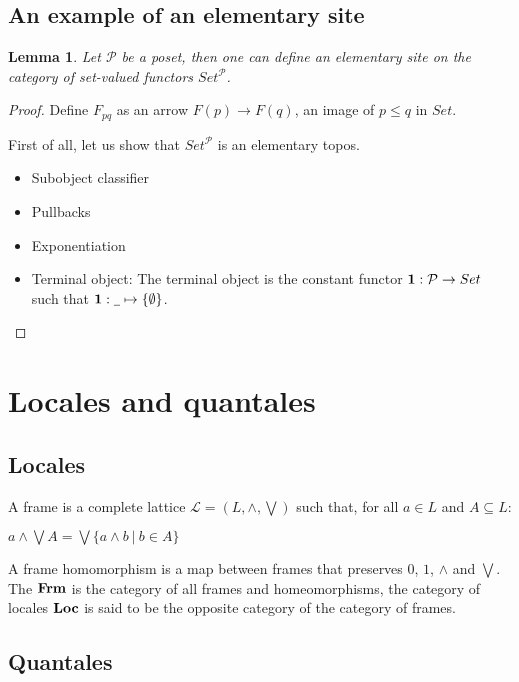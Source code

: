 \documentclass[a4paper]{article}
\theoremstyle{defin}
\theoremstyle{theorem}
\theoremstyle{claim}
\theoremstyle{prop}
\theoremstyle{lemma}
\newtheorem{lemma}{Lemma}
\theoremstyle{fact}
\theoremstyle{ex}
\theoremstyle{col}
\begin{document}
\subsection{An example of an elementary site}

\begin{lemma}
Let $\mathcal{P}$ be a poset, then one can define an elementary site on the category of set-valued functors $Set^{\mathcal{P}}$.
\end{lemma}

\begin{proof}
Define $F_{pq}$ as an arrow $F(p) \to F(q)$, an image of $p \leq q$ in $Set$.

First of all, let us show that $Set^{\mathcal{P}}$ is an elementary topos.
\begin{itemize}
\item Subobject classifier
\item Pullbacks
\item Exponentiation
\item Terminal object:
The terminal object is the constant functor ${\bf 1 } : \mathcal{P} \to Set$ such that ${\bf 1} : \underline{\:\:} \mapsto \{ \emptyset \}$.
\end{itemize}
\end{proof}


\section{Locales and quantales}

\subsection{Locales}

A frame is a complete lattice $\mathcal{L} = (L, \wedge, \bigvee)$ such that, for all $a \in L$ and $A \subseteq L$:
\begin{center}
$a \wedge \bigvee A = \bigvee \{ a \wedge b \: | \: b \in A \}$
\end{center}
A frame homomorphism is a map between frames that preserves $0$, $1$, $\wedge$ and $\bigvee$. The ${\bf Frm}$ is the category of all frames and homeomorphisms, the category of locales ${\bf Loc}$ is said to be the opposite category of the category of frames.

\subsection{Quantales}
\end{document}
